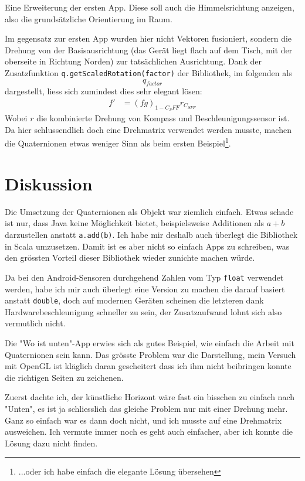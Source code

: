 \documentclass[12pt]{article}
\begin{document}
  Eine Erweiterung der ersten App. Diese soll auch die Himmelsrichtung anzeigen, also die grundsätzliche Orientierung im Raum.

  Im gegensatz zur ersten App wurden hier nicht Vektoren fusioniert, sondern die Drehung von der Basisausrichtung (das Gerät liegt flach auf dem Tisch, mit der oberseite in Richtung Norden) zur tatsächlichen Ausrichtung. Dank der Zusatzfunktion \texttt{q.getScaledRotation(factor)} der Bibliothek, im folgenden als $$q_{factor}$$ dargestellt, liess sich zumindest dies sehr elegant lösen:
  \begin{align*}
    f' &= (f g)_{1-C_SFF} r_{C_{SFF}}
  \end{align*}
  Wobei $r$ die kombinierte Drehung von Kompass und Beschleunigungssensor ist.  Da hier schlussendlich doch eine Drehmatrix verwendet werden musste, machen die Quaternionen etwas weniger Sinn als beim ersten Beispiel\footnote{...oder ich habe einfach die elegante Lösung übersehen}.


  \section{Diskussion}

  Die Umsetzung der Quaternionen als Objekt war ziemlich einfach. Etwas schade ist nur, dass Java keine Möglichkeit bietet, beispielsweise Additionen als $a + b$ darzustellen anstatt \texttt{a.add(b)}. Ich habe mir deshalb auch überlegt die Bibliothek in Scala umzusetzen. Damit ist es aber nicht so einfach Apps zu schreiben, was den grössten Vorteil dieser Bibliothek wieder zunichte machen würde.

  Da bei den Android-Sensoren durchgehend Zahlen vom Typ \texttt{float} verwendet werden, habe ich mir auch überlegt eine Version zu machen die darauf basiert anstatt \texttt{double}, doch auf modernen Geräten scheinen die letzteren dank Hardwarebeschleunigung schneller zu sein, der Zusatzaufwand lohnt sich also vermutlich nicht.

  Die "Wo ist unten"-App erwies sich als gutes Beispiel, wie einfach die Arbeit mit Quaternionen sein kann. Das grösste Problem war die Darstellung, mein Versuch mit OpenGL ist kläglich daran gescheitert dass ich ihm nicht beibringen konnte die richtigen Seiten zu zeichenen.

  Zuerst dachte ich, der künstliche Horizont wäre fast ein bisschen zu einfach nach "Unten", es ist ja schliesslich das gleiche Problem nur mit einer Drehung mehr. Ganz so einfach war es dann doch nicht, und ich musste auf eine Drehmatrix ausweichen. Ich vermute immer noch es geht auch einfacher, aber ich konnte die Lösung dazu nicht finden.
\end{document}
